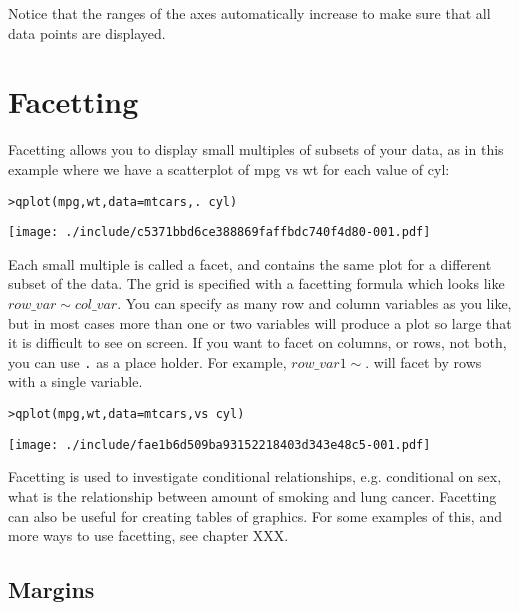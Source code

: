 Notice that the ranges of the axes automatically increase to make sure that all data points are displayed.

\section{Facetting}\label{sec:facetting}

Facetting allows you to display small multiples of subsets of your data, as in this example where we have a scatterplot of mpg vs wt for each value of cyl:

\begin{alltt}
> qplot(mpg, wt, data = mtcars, . ~ cyl)
\end{alltt}
\texttt{[image: ./include/c5371bbd6ce388869faffbdc740f4d80-001.pdf]}
\begin{alltt}

\end{alltt}

Each small multiple is called a facet, and contains the same plot for a different subset of the data.  The grid is specified with a facetting formula which looks like $row\_var \sim col\_var $.  You can specify as many row and column variables as you like, but in most cases more than one or two variables will produce a plot so large that it is difficult to see on screen.  If you want to facet on columns, or rows, not both, you can use {\tt .} as a place holder.  For example, $row\_var1 \sim .$ will facet by rows with a single variable.  

\begin{alltt}
> qplot(mpg, wt, data = mtcars, vs ~ cyl)
\end{alltt}
\texttt{[image: ./include/fae1b6d509ba93152218403d343e48c5-001.pdf]}
\begin{alltt}

\end{alltt}

Facetting is used to investigate conditional relationships, e.g. conditional on sex, what is the relationship between amount of smoking and lung cancer.  Facetting can also be useful for creating tables of graphics.  For some examples of this, and more ways to use facetting, see chapter XXX.

\subsection{Margins}\label{sub:margins}

